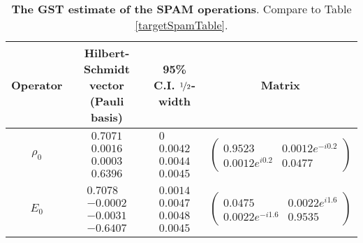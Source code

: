 \documentclass{article}[11pt]
\begin{document}
\begin{table}[h]
\begin{center}
\begin{tabular}[l]{|c|c|c|c|}
\hline
Operator & Hilbert-Schmidt vector (Pauli basis) & 95\% C.I. $\nicefrac{1}{2}$-width & Matrix \\ \hline
$\rho_{0}$ & $ \begin{array}{c}
0.7071 \\ 
0.0016 \\ 
0.0003 \\ 
0.6396
 \end{array} $
 & $ \begin{array}{c}
0 \\ 
0.0042 \\ 
0.0044 \\ 
0.0045
 \end{array} $
 & $ \left(\!\!\begin{array}{cc}
0.9523 & 0.0012e^{-i0.2} \\ 
0.0012e^{i0.2} & 0.0477
 \end{array}\!\!\right) $
 \\ \hline
$E_{0}$ & $ \begin{array}{c}
0.7078 \\ 
-0.0002 \\ 
-0.0031 \\ 
-0.6407
 \end{array} $
 & $ \begin{array}{c}
0.0014 \\ 
0.0047 \\ 
0.0048 \\ 
0.0045
 \end{array} $
 & $ \left(\!\!\begin{array}{cc}
0.0475 & 0.0022e^{i1.6} \\ 
0.0022e^{-i1.6} & 0.9535
 \end{array}\!\!\right) $
 \\ \hline
\end{tabular}

\caption{\textbf{The GST estimate of the SPAM operations}.  Compare to Table \ref{targetSpamTable}.\label{bestGatesetSpamTable}}
\end{center}
\end{table}
\end{document}
